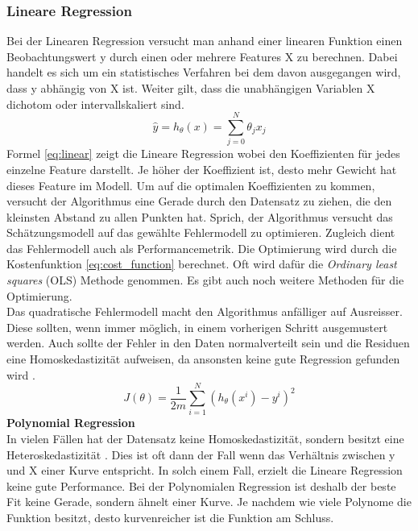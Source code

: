 \subsubsection{Lineare Regression}
Bei der Linearen Regression versucht man anhand einer linearen Funktion einen Beobachtungswert y durch einen oder mehrere Features X zu berechnen. Dabei handelt es sich um ein statistisches Verfahren bei dem davon ausgegangen wird, dass y abhängig von X ist. Weiter gilt, dass die unabhängigen Variablen X dichotom oder intervallskaliert sind.
\begin{equation}
\label{eq:linear}
\hat{y} = h_\theta(x) = \sum_{j=0}^{N} \theta_j x_j
\end{equation}
Formel \eqref{eq:linear} zeigt die Lineare Regression wobei  den Koeffizienten für jedes einzelne Feature darstellt. Je höher der Koeffizient ist, desto mehr Gewicht hat dieses Feature im Modell. Um auf die optimalen Koeffizienten zu kommen, versucht der Algorithmus eine Gerade durch den Datensatz zu ziehen, die den kleinsten Abstand zu allen Punkten hat. Sprich, der Algorithmus versucht das Schätzungsmodell auf das gewählte Fehlermodell zu optimieren. Zugleich dient das Fehlermodell auch als Performancemetrik. Die Optimierung wird durch die Kostenfunktion \eqref{eq:cost_function} berechnet. Oft wird dafür die \textit{Ordinary least squares} (OLS) Methode genommen. Es gibt auch noch weitere Methoden für die Optimierung.\\
Das quadratische Fehlermodell macht den Algorithmus anfälliger auf Ausreisser. Diese sollten, wenn immer möglich, in einem vorherigen Schritt ausgemustert werden. Auch sollte der Fehler in den Daten normalverteilt sein und die Residuen eine Homoskedastizität aufweisen, da ansonsten keine gute Regression gefunden wird \cite{gradient_descent, gradient_descent_2, gradient_descent_3}.
\begin{equation}
\label{eq:cost_function}
J(\theta) = \frac{1}{2m} \sum_{i=1}^{N} (h_\theta(x^i) - y^i)^2
\end{equation}
%
\textbf{Polynomial Regression}\\
In vielen Fällen hat der Datensatz keine Homoskedastizität, sondern besitzt eine Heteroskedastizität \cite{poly}. Dies ist oft dann der Fall wenn das Verhältnis zwischen y und X einer Kurve entspricht. In solch einem Fall, erzielt die Lineare Regression keine gute Performance.
Bei der Polynomialen Regression ist deshalb der beste Fit keine Gerade, sondern ähnelt einer Kurve. Je nachdem wie viele Polynome die Funktion besitzt, desto kurvenreicher ist die Funktion am Schluss.\\
